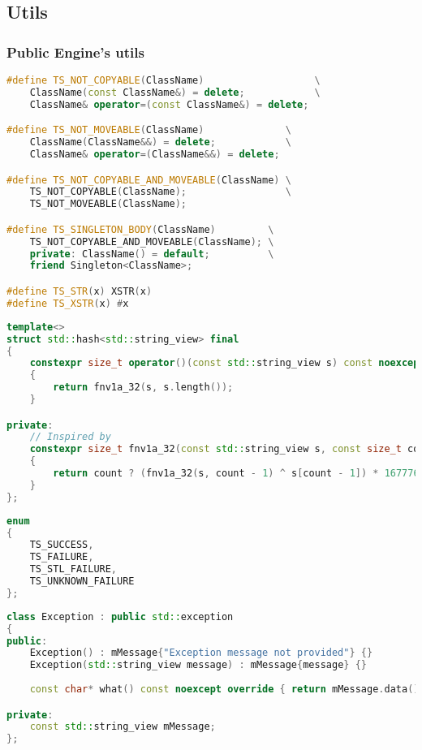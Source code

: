 \newpage
\subsection{Utils}
\subsubsection{Public Engine's utils}
\begin{lstlisting}[language=c++, caption=Macros of Public Engine Utils(./engine/include/tsengine/utils.hpp)]
#define TS_NOT_COPYABLE(ClassName)                   \
    ClassName(const ClassName&) = delete;            \
    ClassName& operator=(const ClassName&) = delete;

#define TS_NOT_MOVEABLE(ClassName)              \
    ClassName(ClassName&&) = delete;            \
    ClassName& operator=(ClassName&&) = delete;

#define TS_NOT_COPYABLE_AND_MOVEABLE(ClassName) \
    TS_NOT_COPYABLE(ClassName);                 \
    TS_NOT_MOVEABLE(ClassName);

#define TS_SINGLETON_BODY(ClassName)         \
    TS_NOT_COPYABLE_AND_MOVEABLE(ClassName); \
    private: ClassName() = default;          \
    friend Singleton<ClassName>;

#define TS_STR(x) XSTR(x)
#define TS_XSTR(x) #x
\end{lstlisting}
\begin{lstlisting}[language=c++, caption=std::string\_view hash of Public Engine Utils(./engine/include/tsengine/utils.hpp)]
template<>
struct std::hash<std::string_view> final
{
    constexpr size_t operator()(const std::string_view s) const noexcept
    {
        return fnv1a_32(s, s.length());
    }

private:
    // Inspired by
    constexpr size_t fnv1a_32(const std::string_view s, const size_t count) const noexcept
    {
        return count ? (fnv1a_32(s, count - 1) ^ s[count - 1]) * 16777619u : 2166136261u;
    }
};
\end{lstlisting}
\begin{lstlisting}[language=c++, caption=Return Codes of Public Engine Utils(./engine/include/tsengine/utils.hpp)]
enum
{
    TS_SUCCESS,
    TS_FAILURE,
    TS_STL_FAILURE,
    TS_UNKNOWN_FAILURE
};
\end{lstlisting}

\begin{lstlisting}[language=c++, caption=Exception of Public Engine Utils(./engine/include/tsengine/utils.hpp)]
class Exception : public std::exception
{
public:
    Exception() : mMessage{"Exception message not provided"} {}
    Exception(std::string_view message) : mMessage{message} {}
    
    const char* what() const noexcept override { return mMessage.data(); }

private:
    const std::string_view mMessage;
};
\end{lstlisting}

